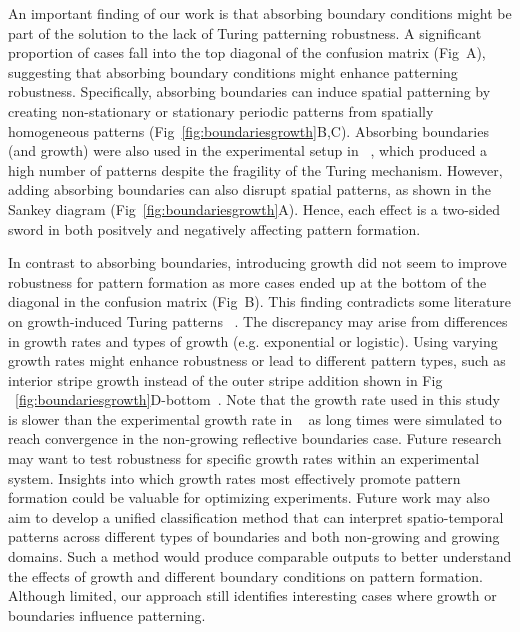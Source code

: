 \documentclass[10pt,letterpaper]{article}
\begin{document}
An important finding of our work is that absorbing boundary conditions might be part of the solution to the lack of Turing patterning robustness. A significant proportion of cases fall into the top diagonal of the confusion matrix (Fig~A), suggesting that absorbing boundary conditions might enhance patterning robustness.
Specifically, absorbing boundaries can induce spatial patterning by creating non-stationary or stationary periodic patterns from spatially homogeneous patterns (Fig~\ref{fig:boundariesgrowth}B,C). Absorbing boundaries (and growth) were also used in the experimental setup in ~\parencite{Oliver2023}, which produced a high number of patterns despite the fragility of the Turing mechanism. However, adding absorbing boundaries can also disrupt spatial patterns, as shown in the Sankey diagram (Fig~\ref{fig:boundariesgrowth}A). Hence, each effect is a two-sided sword in both positvely and negatively affecting pattern formation.

In contrast to absorbing boundaries, introducing growth did not seem to improve robustness for pattern formation as more cases ended up at the bottom of the diagonal in the confusion matrix (Fig~B).
This finding contradicts some literature on growth-induced Turing patterns ~\parencite{gaffney2010}.
The discrepancy may arise from differences in growth rates and types of growth (e.g. exponential or logistic).
Using varying growth rates might enhance robustness or lead to different pattern types, such as interior stripe growth instead of the outer stripe addition shown in Fig ~\ref{fig:boundariesgrowth}D-bottom~\parencite{konow2019turing}. Note that the growth rate used in this study is slower than the experimental growth rate in ~\parencite{Oliver2023} as long times were simulated to reach convergence in the non-growing reflective boundaries case. Future research may want to test robustness for specific growth rates within an experimental system. Insights into which growth rates most effectively promote pattern formation could be valuable for optimizing experiments.
Future work may also aim to develop a unified classification method that can interpret spatio-temporal patterns across different types of boundaries and both non-growing and growing domains. Such a method would produce comparable outputs to better understand the effects of growth and different boundary conditions on pattern formation.
Although limited, our approach still identifies interesting cases where growth or boundaries influence patterning.
\end{document}
